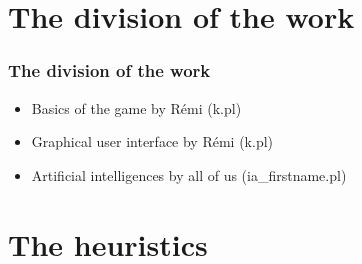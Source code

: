\documentclass[a4paper, 11pt]{beamer}
\begin{document}
\section{The division of the work}
\begin{frame}
\frametitle{The division of the work}
\begin{itemize}
 \item Basics of the game by Rémi (k.pl)
 \item Graphical user interface by Rémi (k.pl)
 \item Artificial intelligences by all of us (ia\_firstname.pl)
\end{itemize}

\end{frame}

\section{The heuristics}
\end{document}
